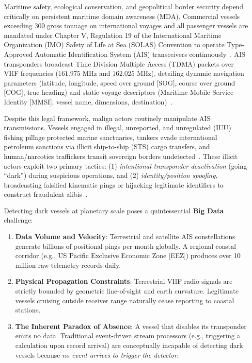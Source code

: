\documentclass[10pt,twocolumn,a4paper]{article}
\begin{document}
Maritime safety, ecological conservation, and geopolitical border security depend critically on persistent maritime domain awareness (MDA). Commercial vessels exceeding 300 gross tonnage on international voyages and all passenger vessels are mandated under Chapter V, Regulation 19 of the International Maritime Organization (IMO) Safety of Life at Sea (SOLAS) Convention to operate Type-Approved Automatic Identification System (AIS) transceivers continuously~\cite{imo2015solas,itur2014m1371}. AIS transponders broadcast Time Division Multiple Access (TDMA) packets over VHF frequencies ($161.975\text{ MHz}$ and $162.025\text{ MHz}$), detailing dynamic navigation parameters (latitude, longitude, speed over ground [SOG], course over ground [COG], true heading) and static voyage descriptors (Maritime Mobile Service Identity [MMSI], vessel name, dimensions, destination)~\cite{itur2014m1371}.

Despite this legal framework, malign actors routinely manipulate AIS transmissions. Vessels engaged in illegal, unreported, and unregulated (IUU) fishing pillage protected marine sanctuaries, tankers evade international petroleum sanctions via illicit ship-to-ship (STS) cargo transfers, and human/narcotics traffickers transit sovereign borders undetected~\cite{park2020illuminating,kroodsma2018tracking}. These illicit actors exploit two primary tactics: (1) \textit{intentional transponder deactivation} (going ``dark'') during suspicious operations, and (2) \textit{identity/position spoofing}, broadcasting falsified kinematic pings or hijacking legitimate identifiers to construct fraudulent alibis~\cite{pelich2019mapping}.

Detecting dark vessels at planetary scale poses a quintessential \textbf{Big Data} challenge:
\begin{enumerate}[leftmargin=*]
    \item \textbf{Data Volume and Velocity}: Terrestrial and satellite AIS constellations generate billions of positional pings per month globally. A regional coastal corridor (e.g., US Pacific Exclusive Economic Zone [EEZ]) produces over 10 million raw telemetry records daily.
    \item \textbf{Physical Propagation Constraints}: Terrestrial VHF radio signals are strictly bounded by geometric line-of-sight and earth curvature. Legitimate vessels cruising outside receiver range naturally cease reporting to coastal stations.
    \item \textbf{The Inherent Paradox of Absence}: A vessel that disables its transponder emits no data. Traditional event-driven stream processors (e.g., triggering a calculation upon record arrival) are conceptually incapable of detecting dark vessels because \textit{no event arrives to trigger the detector}.
\end{enumerate}
\end{document}
